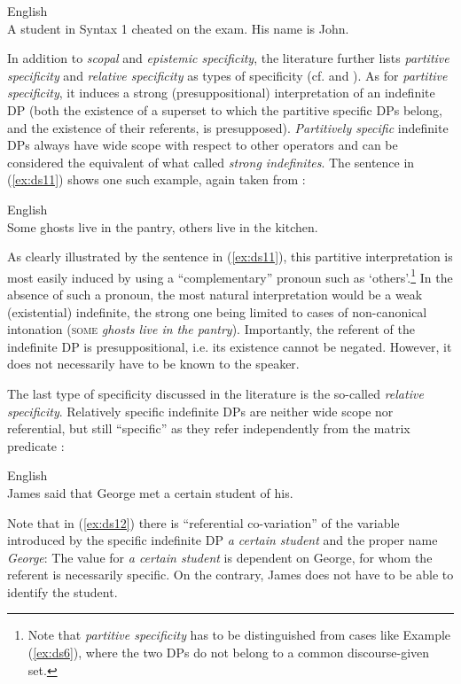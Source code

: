 \documentclass[output=paper,colorlinks,citecolor=brown]{langscibook}
\begin{document}
\ea\label{ex:ds10} English\\
A student in Syntax 1 cheated on the exam. His name is John.\\
\z

In addition to \textit{scopal} and \textit{epistemic specificity}, the literature further lists \textit{partitive specificity} and \textit{relative specificity} as types of specificity (cf. \cite{Farkas1995} and \cite{Heusinger2002}). As for \textit{partitive specificity}, it induces a strong (presuppositional) interpretation of an indefinite DP (both the existence of a superset to which the partitive specific DPs belong, and the existence of their referents, is presupposed). \textit{Partitively specific} indefinite DPs always have wide scope with respect to other operators and can be considered the equivalent of what \citet{Milsark1974} called \textit{strong indefinites}. The sentence in (\ref{ex:ds11}) shows one such example, again taken from \citet[260]{Heusinger2002}:

\ea\label{ex:ds11} English\\
Some ghosts live in the pantry, others live in the kitchen.\\
\z

As clearly illustrated by the sentence in (\ref{ex:ds11}), this partitive interpretation is most easily induced by using a “complementary” pronoun such as ‘others’.\footnote{Note that \textit{partitive specificity} has to be distinguished from cases like Example (\ref{ex:ds6}), where the two DPs do not belong to a common discourse-given set.} In the absence of such a pronoun, the most natural interpretation would be a weak (existential) indefinite, the strong one being limited to cases of non-canonical intonation (\textsc{some} \textit{ghosts live in the pantry}). Importantly, the referent of the indefinite DP is presuppositional, i.e. its existence cannot be negated. However, it does not necessarily have to be known to the speaker.

The last type of specificity discussed in the literature is the so-called \textit{relative specificity}. Relatively specific indefinite DPs are neither wide scope nor referential, but still “specific” as they refer independently from the matrix predicate \citep[cf.][262]{Heusinger2002}:

\ea\label{ex:ds12} English\\
James said that George met a certain student of his. \\
\z

Note that in (\ref{ex:ds12}) there is “referential co-variation” of the variable introduced by the specific indefinite DP \textit{a certain student} and the proper name \textit{George}: The value for \textit{a certain student} is dependent on George, for whom the referent is necessarily specific. On the contrary, James does not have to be able to identify the student.
\end{document}
